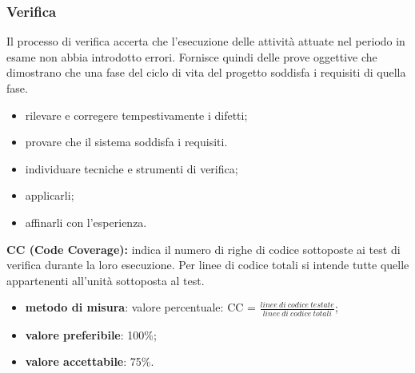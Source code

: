 \subsubsection{Verifica}
Il processo di verifica accerta che l'esecuzione delle attività attuate nel periodo in esame non abbia introdotto errori.
Fornisce quindi delle prove oggettive che dimostrano che una fase del ciclo di vita del progetto soddisfa i requisiti di quella fase.
\begin{itemize}
    \item rilevare e corregere tempestivamente i difetti;
    \item provare che il sistema soddisfa i requisiti.
\end{itemize}
\begin{itemize}
    \item individuare tecniche e strumenti di verifica;
    \item applicarli;
    \item affinarli con l'esperienza.
\end{itemize}
\textbf{CC (Code Coverage):} indica il numero di righe di codice sottoposte ai test di verifica durante la loro esecuzione. Per linee di codice totali 
si intende tutte quelle appartenenti all'unità sottoposta al test.
\begin{itemize}
    \item \textbf{metodo di misura}: valore percentuale: CC = $\frac{linee \ di \ codice \ testate}{linee \ di \ codice \ totali}$;
    \item \textbf{valore preferibile}: 100\%;
    \item \textbf{valore accettabile}: 75\%.
\end{itemize}
